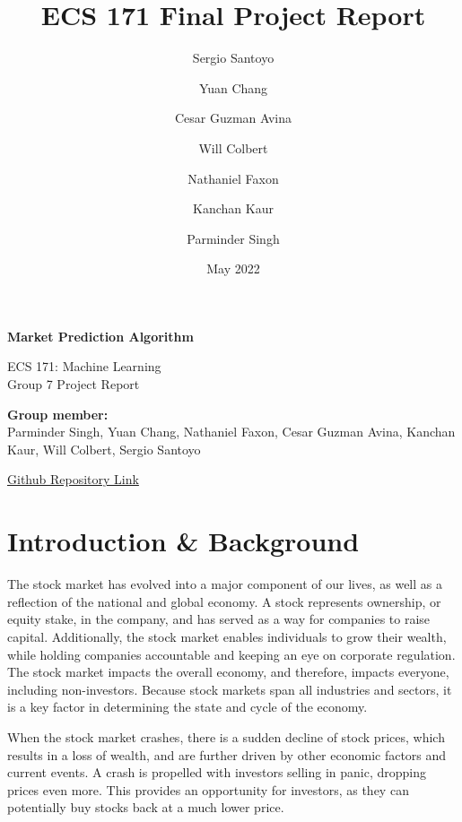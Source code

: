 \documentclass{article}
\title{ECS 171 Final Project Report}
\author{
  Sergio Santoyo\\
  \and
  Yuan Chang\\
  \and
  Cesar Guzman Avina\\
  \and
  Will Colbert\\
  \and
  Nathaniel Faxon\\
  \and
  Kanchan Kaur\\
  \and
  Parminder Singh\\
}
\date{May 2022}
\begin{document}
\begin{titlepage}
   \begin{center}
       \vspace*{4cm}
		\Large
       \textbf{Market Prediction Algorithm}

       \vspace{0.5cm}
        ECS 171: Machine Learning \\
        Group 7 Project Report
       \vspace{1.5cm}

       \textbf{Group member:}\\
Parminder Singh, Yuan Chang, Nathaniel Faxon, Cesar Guzman Avina, Kanchan Kaur, Will Colbert, Sergio Santoyo

       \vfill
       \href{https://github.com/nfax117/ECS171_Proj1}{Github Repository Link}
            
       \vspace{0.8cm}
%     
%            
            
   \end{center}
\end{titlepage}


\section{Introduction \& Background}
The stock market has evolved into a major component of our lives, as well as a reflection of the national and global economy. A stock represents ownership, or equity stake, in the company, and has served as a way for companies to raise capital. Additionally, the stock market enables individuals to grow their wealth, while holding companies accountable and keeping an eye on corporate regulation. The stock market impacts the overall economy, and therefore, impacts everyone, including non-investors. Because stock markets span all industries and sectors, it is a key factor in determining the state and cycle of the economy.

When the stock market crashes, there is a sudden decline of stock prices, which results in a loss of wealth, and are further driven by other economic factors and current events. A crash is propelled with investors selling in panic, dropping prices even more. This provides an opportunity for investors, as they can potentially buy stocks back at a much lower price.
\end{document}
